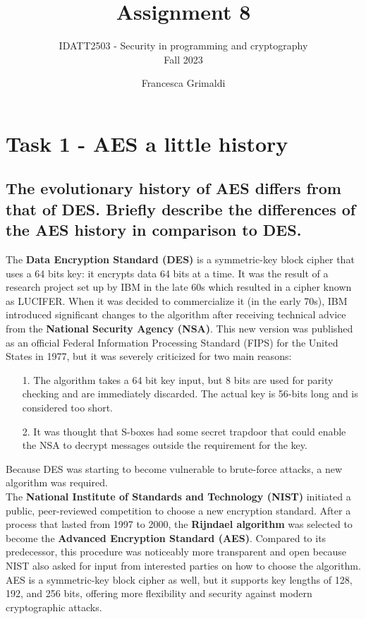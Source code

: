 \documentclass{article}
\title{%
    \huge Assignment 8}
\subtitle{%
    IDATT2503 - Security in programming and cryptography \\
    Fall 2023
    }
\author{%
  Francesca Grimaldi
}
\date{}
\begin{document}
\maketitle


\section{Task 1 - AES a little history}

\subsection{The evolutionary history of AES differs from that of DES. Briefly describe the differences of the AES history in comparison to DES.}
The \textbf{Data Encryption Standard (DES)} is a symmetric-key block cipher that uses a 64 bits key: it encrypts data 64 bits at a time.
It was the result of a research project set up by IBM in the late 60s which resulted in a cipher known as LUCIFER.
When it was decided to commercialize it (in the early 70s), IBM introduced significant changes to the algorithm after receiving technical advice from the \textbf{National Security Agency (NSA)}.
This new version was published as an official Federal Information Processing Standard (FIPS) for the United States in 1977, but it was severely criticized for two main reasons:
\begin{itemize}
    \item[1.] The algorithm takes a 64 bit key input, but 8 bits are used for parity checking and are immediately discarded. The actual key is 56-bits long and is considered too short.
    \item[2.] It was thought that S-boxes had some secret trapdoor that could enable the NSA to decrypt messages outside the requirement for the key.
\end{itemize}
Because DES was starting to become vulnerable to brute-force attacks, a new algorithm was required.\\
The \textbf{National Institute of Standards and Technology (NIST)} initiated a public, peer-reviewed competition to choose a new encryption standard. After a process that lasted from 1997 to 2000, the \textbf{Rijndael algorithm} was selected to become the \textbf{Advanced Encryption Standard (AES)}.
Compared to its predecessor, this procedure was noticeably more transparent and open because NIST also asked for input from interested parties on how to choose the algorithm.\\
AES is a symmetric-key block cipher as well, but it supports key lengths of 128, 192, and 256 bits, offering more flexibility and security against modern cryptographic attacks.
\end{document}
